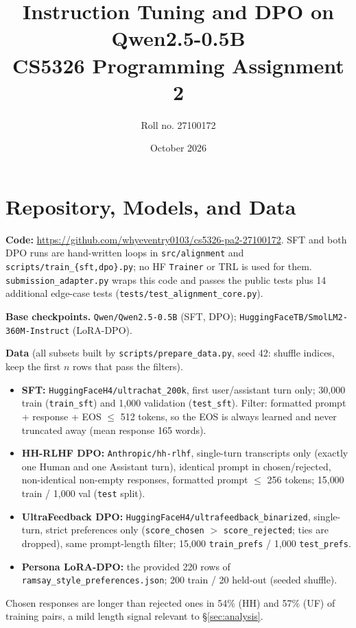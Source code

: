\documentclass[10pt]{article}
\title{\vspace{-2em}Instruction Tuning and DPO on Qwen2.5-0.5B\\\large CS5326 Programming Assignment 2}
\author{Roll no. 27100172}
\date{October 2026}
\begin{document}
\maketitle
\vspace{-1.5em}

\section{Repository, Models, and Data}
\textbf{Code:} \url{https://github.com/whyeventry0103/cs5326-pa2-27100172}.
SFT and both DPO runs are hand-written loops in \texttt{src/alignment} and \texttt{scripts/train\_\{sft,dpo\}.py}; no HF \texttt{Trainer} or TRL is used for them. \texttt{submission\_adapter.py} wraps this code and passes the public tests plus 14 additional edge-case tests (\texttt{tests/test\_alignment\_core.py}).

\textbf{Base checkpoints.} \texttt{Qwen/Qwen2.5-0.5B} (SFT, DPO); \texttt{HuggingFaceTB/SmolLM2-360M-Instruct} (LoRA-DPO).

\textbf{Data} (all subsets built by \texttt{scripts/prepare\_data.py}, seed 42: shuffle indices, keep the first $n$ rows that pass the filters).
\begin{itemize}
\item \textbf{SFT:} \texttt{HuggingFaceH4/\allowbreak ultrachat\_200k}, first user/assistant turn only; 30{,}000 train (\texttt{train\_sft}) and 1{,}000 validation (\texttt{test\_sft}). Filter: formatted prompt + response + EOS $\le$ 512 tokens, so the EOS is always learned and never truncated away (mean response 165 words).
\item \textbf{HH-RLHF DPO:} \texttt{Anthropic/hh-rlhf}, single-turn transcripts only (exactly one Human and one Assistant turn), identical prompt in chosen/rejected, non-identical non-empty responses, formatted prompt $\le$ 256 tokens; 15{,}000 train / 1{,}000 val (\texttt{test} split).
\item \textbf{UltraFeedback DPO:} \texttt{HuggingFaceH4/\allowbreak ultrafeedback\_binarized}, single-turn, strict preferences only (\texttt{score\_chosen} $>$ \texttt{score\_rejected}; ties are dropped), same prompt-length filter; 15{,}000 \texttt{train\_prefs} / 1{,}000 \texttt{test\_prefs}.
\item \textbf{Persona LoRA-DPO:} the provided 220 rows of \texttt{ramsay\_style\_preferences.json}; 200 train / 20 held-out (seeded shuffle).
\end{itemize}
Chosen responses are longer than rejected ones in 54\% (HH) and 57\% (UF) of training pairs, a mild length signal relevant to \S\ref{sec:analysis}.
\end{document}
